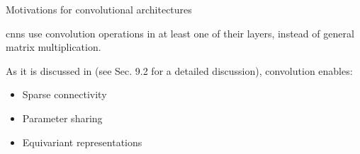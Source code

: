%
%
%

\begin{frame}[t,allowframebreaks]{Motivations for convolutional architectures}

    \glspl{cnn} use  \gls{convolution}
    operations in at least one of their layers, instead of general matrix multiplication.

    As it is discussed in \cite{Goodfellow:2017MITDL} 
    (see Sec. 9.2 for a detailed discussion), \gls{convolution} 
    enables:
    \begin{itemize}
        \item Sparse connectivity
        \item Parameter sharing
        \item Equivariant representations
    \end{itemize}

\end{frame}
